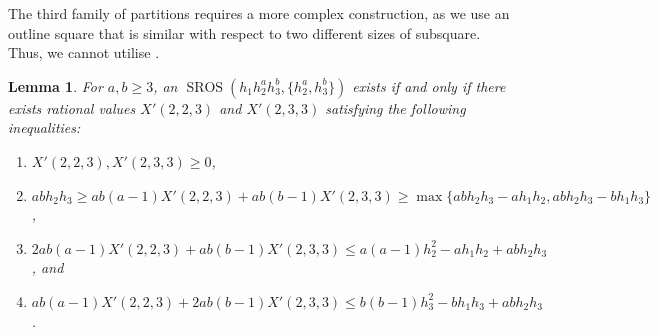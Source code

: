 \documentclass[preprint,nonatbib]{elsarticle}
\DeclareMathOperator{\SROS}{SROS}
\newtheorem{lemma}[theorem]{Lemma}
\theoremstyle{definition}
\numberwithin{equation}{section}
\begin{document}
The third family of partitions requires a more complex construction, as we use an outline square that is similar with respect to two different sizes of subsquare. Thus, we cannot utilise .

\begin{lemma}
\label{lemma: h_1h_2^ah_3^b inequalities}
    For $a,b\geq 3$, an $\SROS(h_1 h_2^a h_3^b, \{h_2^a,h_3^b\})$ exists if and only if there exists rational values $X'(2,2,3)$ and $X'(2,3,3)$ satisfying the following inequalities:
    \begin{enumerate}[label=\textup{(\arabic*)}]
        \item $X'(2,2,3),X'(2,3,3)\geq 0$,
        \item $abh_2h_3\geq ab(a-1)X'(2,2,3) + ab(b-1)X'(2,3,3)\geq \max\{abh_2h_3-ah_1h_2,abh_2h_3-bh_1h_3\}$,
        \item $2ab(a-1)X'(2,2,3) + ab(b-1)X'(2,3,3)\leq a(a-1)h_2^2 - ah_1h_2 + abh_2h_3$, and
        \item $ab(a-1)X'(2,2,3) + 2ab(b-1)X'(2,3,3)\leq b(b-1)h_3^2 - bh_1h_3 + abh_2h_3$.
    \end{enumerate}
\end{lemma}
\end{document}
